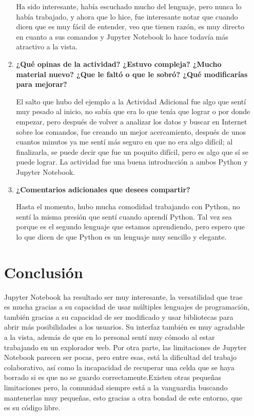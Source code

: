 \documentclass[a4paper]{article}
\begin{document}
\begin{enumerate}
\begin{enumerate}
Ha sido interesante, había escuchado mucho del lenguaje, pero nunca lo había trabajado, y ahora que lo hice, fue interesante notar que cuando dicen que es muy fácil de entender, veo que tienen razón, es muy directo en cuanto a sus comandos y Jupyter Notebook lo hace todavía más atractivo a la vista.
\item \textbf{¿Qué opinas de la actividad? ¿Estuvo compleja? ¿Mucho material nuevo? ¿Que le faltó o que le sobró? ¿Qué modificarías para mejorar?}

El salto que hubo del ejemplo a la Actividad Adicional fue algo que sentí muy pesado al inicio, no sabía que era lo que tenía que lograr o por donde empezar, pero después de volver a analizar los datos y buscar en Internet sobre los comandos, fue creando un mejor acercamiento, después de unos cuantos minutos ya me sentí más seguro en que no era algo difícil; al finalizarla, se puede decir que fue un poquito difícil, pero es algo que sí se puede lograr. La actividad fue una buena introducción a ambos Python y Jupyter Notebook.
\item \textbf{¿Comentarios adicionales que desees compartir?}

Hasta el momento, hubo mucha comodidad trabajando con Python, no sentí la misma presión que sentí cuando aprendí Python. Tal vez sea porque es el segundo lenguaje que estamos aprendiendo, pero espero que lo que dicen de que Python es un lenguaje muy sencillo y elegante.
\end{enumerate}

\section{Conclusión}

Jupyter Notebook ha resultado ser muy interesante, la versatilidad que trae es mucha gracias a su capacidad de usar múltiples lenguajes de programación, también gracias a su capacidad de ser modificado y usar bibliotecas para abrir más posibilidades a los usuarios. Su interfaz también es muy agradable a la vista, además de que en lo personal sentí muy cómodo al estar trabajando en un explorador web. 
Por otra parte, las limitaciones de Jupyter Notebook parecen ser pocas, pero entre esas, está la dificultad del trabajo colaborativo, así como la incapacidad de recuperar una celda que se haya borrado si es que no se guardo correctamente.Existen otras pequeñas limitaciones pero, la comunidad siempre está a la vanguardia buscando mantenerlas muy pequeñas, esto gracias a otra bondad de este entorno, que es su código libre. 


\end{enumerate}
\end{document}
